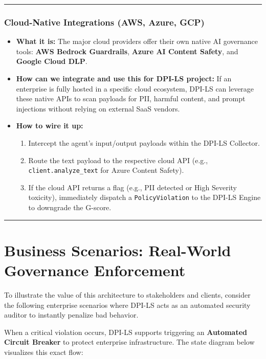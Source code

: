 \documentclass[11pt,a4paper]{article}
\begin{document}
\vspace{0.2cm}\hrule\vspace{0.2cm}

\subsubsection*{Cloud-Native Integrations (AWS, Azure, GCP)}
\begin{itemize}
    \item \textbf{What it is:} The major cloud providers offer their own native AI governance tools: \textbf{AWS Bedrock Guardrails}, \textbf{Azure AI Content Safety}, and \textbf{Google Cloud DLP}.
    \item \textbf{How can we integrate and use this for DPI-LS project:} If an enterprise is fully hosted in a specific cloud ecosystem, DPI-LS can leverage these native APIs to scan payloads for PII, harmful content, and prompt injections without relying on external SaaS vendors.
    \item \textbf{How to wire it up:}
    \begin{enumerate}
        \item Intercept the agent's input/output payloads within the DPI-LS Collector.
        \item Route the text payload to the respective cloud API (e.g., \texttt{client.analyze\_text} for Azure Content Safety).
        \item If the cloud API returns a flag (e.g., PII detected or High Severity toxicity), immediately dispatch a \texttt{PolicyViolation} to the DPI-LS Engine to downgrade the G-score.
    \end{enumerate}
\end{itemize}

\vspace{0.5cm}
\hrule
\vspace{0.5cm}

\section{Business Scenarios: Real-World Governance Enforcement}

To illustrate the value of this architecture to stakeholders and clients, consider the following enterprise scenarios where DPI-LS acts as an automated security auditor to instantly penalize bad behavior. 

When a critical violation occurs, DPI-LS supports triggering an \textbf{Automated Circuit Breaker} to protect enterprise infrastructure. The state diagram below visualizes this exact flow:
\end{document}
